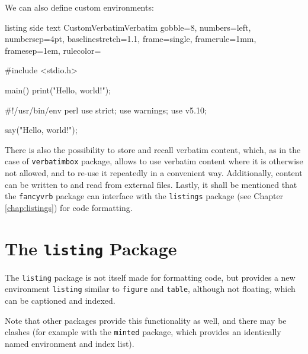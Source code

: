 \documentclass[article,a4paper,oneside,10pt]{memoir}
\newcommand\code[1]{\texttt{#1}}
\begin{document}
We can also define custom environments:

\begin{tcblisting}{listing side text}
    \DefineVerbatimEnvironment%
        {CustomVerbatim}{Verbatim}{%
        gobble=8,
        numbers=left,
        numbersep=4pt,
        baselinestretch=1.1,
        frame=single,
        framerule=1mm,
        framesep=1em,
        rulecolor=\color{teal}}

    \begin{CustomVerbatim}[%
        label={%
        [\fbox{\Large{Hello World In C}}]
        end of code}]
        #include <stdio.h>

        main() {
            print("Hello, world!\n");
        }
    \end{CustomVerbatim}

    \begin{CustomVerbatim}[%
      label={%
      [\fbox{\Large{Hello World in Perl}}]
      end of code}]
        #!/usr/bin/env perl
        use strict;
        use warnings;
        use v5.10;

        say("Hello, world!");
    \end{CustomVerbatim}
\end{tcblisting}

There is also the possibility to  store and recall verbatim content, which, as
in  the case  of \code{verbatimbox}  package, allows  to use  verbatim content
where it is otherwise not allowed, and to re-use it repeatedly in a convenient
way.   Additionally,  content  can  be  written  to  and  read  from  external
files. Lastly,  it shall  be mentioned  that the  \code{fancyvrb} package  can
interface with  the \code{listings} package (see  Chapter \ref{chap:listings})
for code formatting.


\newpage
\chapter{The \code{listing} Package \cite{listing}}
\label{chap:listing}


The  \code{listing}  package is  not  itself  made  for formatting  code,  but
provides  a  new  environment  \code{listing}  similar  to  \code{figure}  and
\code{table}, although not floating, which  can be captioned and indexed. 

Note that other packages provide this  functionality as well, and there may be
clashes  (for  example  with  the \code{minted}  package,  which  provides  an
identically named environment and index list)\footnotemark.
\end{document}
